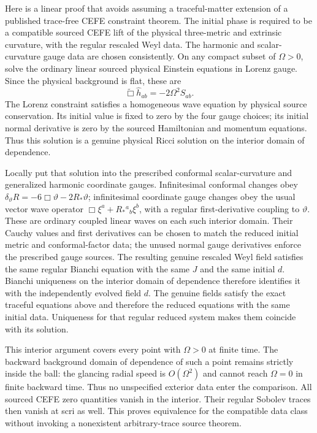 Here is a linear proof that avoids assuming a traceful-matter extension of a
published trace-free CEFE constraint theorem.  The initial phase is required
to be a compatible sourced CEFE lift of the physical three-metric and
extrinsic curvature, with the regular rescaled Weyl data.  The harmonic and
scalar-curvature gauge data are chosen consistently.  On any compact subset
of $\Omega>0$, solve the ordinary linear sourced physical Einstein equations
in Lorenz gauge.  Since the physical background is flat, these are
\[
 \widetilde\Box\widehat h_{ab}=-2\Omega^2S_{ab}.
\]
The Lorenz constraint satisfies a homogeneous wave equation by physical
source conservation.  Its initial value is fixed to zero by the four gauge
choices; its initial normal derivative is zero by the sourced Hamiltonian
and momentum equations.  Thus this solution is a genuine physical Ricci
solution on the interior domain of dependence.

Locally put that solution into the prescribed conformal scalar-curvature
and generalized harmonic coordinate gauges.  Infinitesimal conformal changes
obey $\delta_\vartheta R=-6\Box\vartheta-2R_*\vartheta$; infinitesimal
coordinate gauge changes obey the usual vector wave operator
$\Box\xi^a+R_*{}^a{}_b\xi^b$, with a regular first-derivative coupling to
$\vartheta$.  These are ordinary coupled linear waves on each such interior
domain.  Their Cauchy values and first derivatives can be chosen to match
the reduced initial metric and conformal-factor data; the unused normal
gauge derivatives enforce the prescribed gauge sources.  The resulting
genuine rescaled Weyl field satisfies the same regular Bianchi equation with
the same $J$ and the same initial $d$.  Bianchi uniqueness on the interior
domain of dependence therefore identifies it with the independently evolved
field $d$.  The genuine fields satisfy the exact traceful equations above and therefore
the reduced equations with the same initial data.  Uniqueness for that
regular reduced system makes them coincide with its solution.

This interior argument covers every point with $\Omega>0$ at finite time.
The backward background domain of dependence of such a point remains
strictly inside the ball: the glancing radial speed is $O(\Omega^2)$ and
cannot reach $\Omega=0$ in finite backward time.  Thus no unspecified exterior
data enter the comparison.  All sourced CEFE zero quantities vanish in the
interior.  Their regular Sobolev traces then vanish at scri as well.
This proves equivalence for the compatible data class without invoking
a nonexistent arbitrary-trace source theorem.

